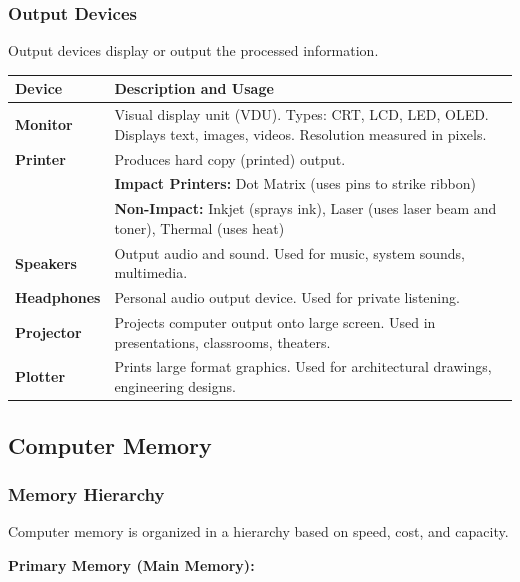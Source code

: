 \documentclass[12pt,a4paper]{article}
\begin{document}
\subsubsection{Output Devices}
Output devices display or output the processed information.

\begin{longtable}{|p{3cm}|p{10cm}|}
\hline
\textbf{Device} & \textbf{Description and Usage} \\
\hline
\endhead

\textbf{Monitor} & Visual display unit (VDU). Types: CRT, LCD, LED, OLED. Displays text, images, videos. Resolution measured in pixels. \\
\hline

\textbf{Printer} & Produces hard copy (printed) output. \\
& \textbf{Impact Printers:} Dot Matrix (uses pins to strike ribbon) \\
& \textbf{Non-Impact:} Inkjet (sprays ink), Laser (uses laser beam and toner), Thermal (uses heat) \\
\hline

\textbf{Speakers} & Output audio and sound. Used for music, system sounds, multimedia. \\
\hline

\textbf{Headphones} & Personal audio output device. Used for private listening. \\
\hline

\textbf{Projector} & Projects computer output onto large screen. Used in presentations, classrooms, theaters. \\
\hline

\textbf{Plotter} & Prints large format graphics. Used for architectural drawings, engineering designs. \\
\hline

\end{longtable}

\subsection{Computer Memory}

\subsubsection{Memory Hierarchy}
Computer memory is organized in a hierarchy based on speed, cost, and capacity.

\textbf{Primary Memory (Main Memory):}
\end{document}
